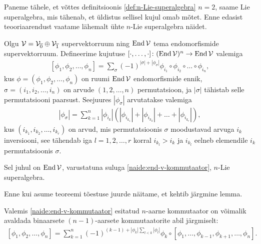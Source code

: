 Paneme tähele, et võttes definitsioonis \ref{def:n-Lie-superalgebra}
$n = 2$, saame Lie superalgebra, mis tähenab, et üldistus
sellisel kujul omab mõtet. Enne edasist teooriaarendust vaatame
lähemalt ühte $n$-Lie superalgebra näidet.

\begin{thm}
    Olgu $\mathcal{V} = \mathcal{V}_{\overline{0}} \oplus \mathcal{V}_{\overline{1}}$
    supervektorruum ning $\operatorname{End} \mathcal{V}$ tema endomorfismide
    supervektorruum. Defineerime kujutuse
    $[\cdot, \dots, \cdot] \colon (\operatorname{End} \mathcal{V})^n \to \operatorname{End} \mathcal{V}$ valemiga
    \begin{align}\label{naide:end-v-kommutaator}
        [\phi_1, \phi_2, \dots, \phi_n] =
        \sum_\sigma (-1)^{|\sigma|+|\phi_\sigma|}
            \phi_{i_1} \circ \phi_{i_2} \circ \ldots \circ \phi_{i_n},
    \end{align}
    kus $\phi = (\phi_1, \phi_2, \dots, \phi_n)$ on ruumi
    $\operatorname{End} \mathcal{V}$ endomorfismide ennik,
    $\mathrm{\sigma} = (i_1, i_2, \dots, i_n)$ on arvude
    $(1, 2, \dots, n)$ permutatsioon, ja $|\sigma|$
    tähistab selle permutatsiooni paarsust. Seejuures
    $|\phi_\sigma|$ arvutatakse valemiga
    \begin{align}\label{eq:permutation-parity}
        |\phi_\sigma| = \sum_{k=1}^{n} |\phi_{i_k}|
            \left(
                |\phi_{i_{k_1}}| + |\phi_{i_{k_2}}| + \dots +
                |\phi_{i_{k_r}}|
            \right),
    \end{align}
    kus $(i_{k_1}, i_{k_2}, \dots, i_{k_r})$ on arvud, mis
    permutatsioonis $\sigma$ moodustavad arvuga $i_k$ inversiooni,
    see tähendab iga $l = 1, 2, \dots, r$ korral $i_{k_l} > i_k$ ja
    $i_{k_l}$ eelneb elemendile $i_k$ permutatsioonis $\sigma$.

    Sel juhul on $\operatorname{End} \mathcal{V}$, varustatuna suluga
    \eqref{naide:end-v-kommutaator}, $n$-Lie superalgebra.
\end{thm}

Enne kui asume teoreemi tõestuse juurde näitame, et kehtib järgmine
lemma.

\begin{lemma}
    Valemis \eqref{naide:end-v-kommutaator} esitatud $n$-aarne
    kommutaator on võimalik avaldada binaarsete $(n-1)$-aarsete
    kommutaatorite abil järgmiselt:
    \begin{align}\label{eq:n komm by n-1 komm}
        [\phi_1, \phi_2, \dots, \phi_n] =
        \sum_{k=1}^{n} (-1)^{
            (k-1) + |\phi_k| \sum_{l < k} |\phi_l|
        } \phi_k \circ [
            \phi_1, \dots, \phi_{k-1}, \phi_{k+1}, \dots, \phi_n
        ].
    \end{align}
\end{lemma}

